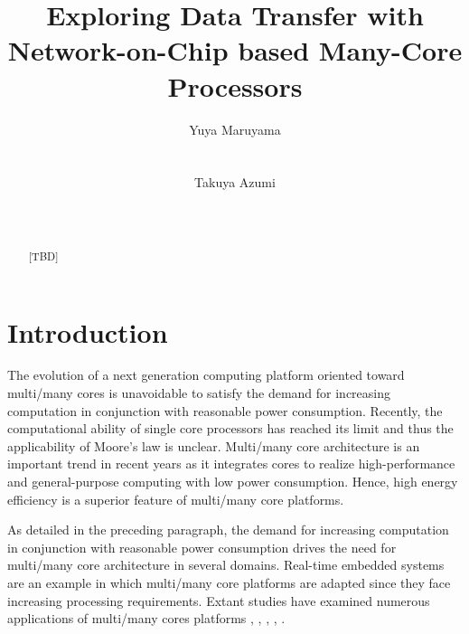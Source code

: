 \documentclass{sig-alternate-05-2015}
\author{
\alignauthor Yuya Maruyama\\
\affaddr{Graduate School of Engineering Science}\\
\affaddr{Osaka University}\\
\alignauthor Takuya Azumi\\
\affaddr{Graduate School of Engineering Science}\\
\affaddr{Osaka University}\\
}
\title{Exploring Data Transfer with Network-on-Chip based Many-Core Processors}
\begin{document}

\maketitle

\setcounter{topnumber}{5}%
\def\topfraction{1.00}%
\setcounter{bottomnumber}{5}%
\def\bottomfraction{1.00}%
\setcounter{totalnumber}{10}%
\def\textfraction{0.00}%


\begin{abstract}
[TBD]
\end{abstract}



\section{Introduction}
The evolution of a next generation computing platform oriented toward multi/many cores is unavoidable to satisfy the demand for increasing computation in conjunction with reasonable power consumption.
Recently, the computational ability of single core processors has reached its limit and thus the applicability of Moore's law \cite{moore2006cramming} is unclear.
Multi/many core architecture is an important trend in recent years as it integrates cores to realize high-performance and general-purpose computing with low power consumption.
Hence, high energy efficiency is a superior feature of multi/many core platforms.

 As detailed in the preceding paragraph, the demand for increasing computation in conjunction with reasonable power consumption drives the need for multi/many core architecture in several domains.
Real-time embedded systems are an example in which multi/many core platforms are adapted since they face increasing processing requirements.
Extant studies have examined numerous applications of multi/many cores platforms \cite{becker2016contention}, \cite{saidi2015shift}, \cite{perret2016temporal}, \cite{perret2016mapping}, \cite{becker2014mapping}.
\end{document}
